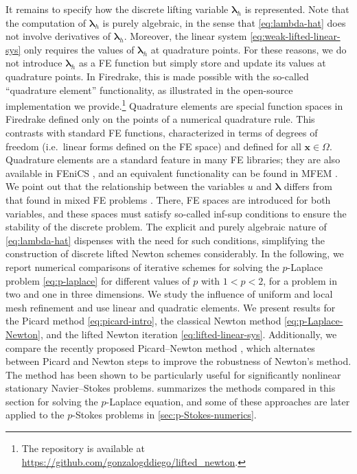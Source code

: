 \documentclass[11pt,pdflatex,sn-mathphys-num]{sn-jnl}
\theoremstyle{thmstyleone}%
\theoremstyle{thmstyletwo}%
\theoremstyle{thmstylethree}%
\newcommand{\bs}[1]{\ensuremath{\boldsymbol{#1}}}
\begin{document}
It remains to specify how the discrete lifting variable $\bs \lambda_h$ is represented. Note that the computation of $\bs \lambda_h$ is purely algebraic, in the sense that \eqref{eq:lambda-hat} does not involve derivatives of $\bs\lambda_h$. Moreover, the linear system \eqref{eq:weak-lifted-linear-sys} only requires the values of $\bs \lambda_h$ at quadrature points. For these reasons, we do not introduce $\bs\lambda_h$ as a FE function but simply store and update its values at quadrature points. In Firedrake, this is made possible with the so-called ``quadrature element'' functionality, as illustrated in the open-source implementation we provide.\footnote{The repository is available at \href{https://github.com/gonzalogddiego/lifted_newton}{https://github.com/gonzalogddiego/lifted\_newton}.}
Quadrature elements are special function spaces in Firedrake defined only on the points of a numerical quadrature rule. This contrasts with standard FE functions, characterized in terms of degrees of freedom (i.e.~linear forms defined on the FE space) and defined for all $\bs{x}\in\Omega$. Quadrature elements are a standard feature in many FE libraries; they are also available in FEniCS \cite{LoggEtal2012}, and an equivalent functionality can be found in MFEM \cite{AndersonEtAl2021}. 
We point out that the relationship between the variables $u$ and $
\bs \lambda$ differs from that found in mixed FE problems \cite{BrezziFortin91}. There, FE spaces are introduced for both variables, and these spaces must satisfy so-called inf-sup conditions to ensure the stability of the discrete problem. The explicit and purely algebraic nature of \eqref{eq:lambda-hat} dispenses with the need for such conditions, simplifying the construction of discrete lifted Newton schemes considerably.    
In the following, we report numerical comparisons of iterative schemes for solving the $p$-Laplace problem \eqref{eq:p-laplace} for different values of $p$ with $1<p<2$, for a problem in two and one in three dimensions. We study the influence of uniform and local mesh refinement and use linear and quadratic elements.
We present results for the Picard method \eqref{eq:picard-intro}, the classical Newton method \eqref{eq:p-Laplace-Newton}, and the lifted Newton iteration \eqref{eq:lifted-linear-sys}. Additionally, we compare the recently proposed Picard--Newton method \cite{PollockRebholzTuXiao25}, which alternates between Picard and Newton steps to improve the robustness of Newton's method. The method has been shown to be particularly useful for significantly nonlinear stationary Navier--Stokes problems.  summarizes the methods compared in this section for solving the $p$-Laplace equation, and some of these approaches are later applied to the $p$-Stokes problems in \cref{sec:p-Stokes-numerics}.
\end{document}

